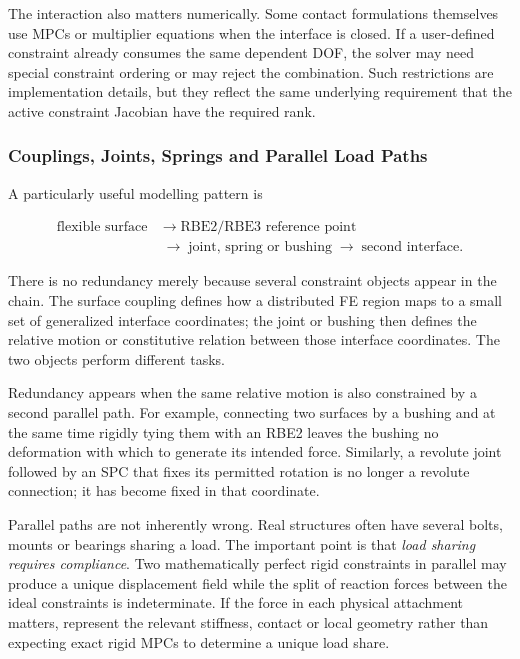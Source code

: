 The interaction also matters numerically. Some contact formulations themselves
use MPCs or multiplier equations when the interface is closed. If a user-defined
constraint already consumes the same dependent DOF, the solver may need special
constraint ordering or may reject the combination. Such restrictions are
implementation details, but they reflect the same underlying requirement that
the active constraint Jacobian have the required rank.

\subsubsection{Couplings, Joints, Springs and Parallel Load Paths}

A particularly useful modelling pattern is

\begin{equation}
\begin{aligned}
    \text{flexible surface}
    &\;\longrightarrow\;
    \text{RBE2/RBE3 reference point}\\
    &\;\longrightarrow\;
    \text{joint, spring or bushing}
    \;\longrightarrow\;
    \text{second interface}.
\end{aligned}
\end{equation}

There is no redundancy merely because several constraint objects appear in the
chain. The surface coupling defines how a distributed FE region maps to a small
set of generalized interface coordinates; the joint or bushing then defines the
relative motion or constitutive relation between those interface coordinates.
The two objects perform different tasks.

Redundancy appears when the same relative motion is also constrained by a second
parallel path. For example, connecting two surfaces by a bushing and at the same
time rigidly tying them with an RBE2 leaves the bushing no deformation with which
to generate its intended force. Similarly, a revolute joint followed by an SPC
that fixes its permitted rotation is no longer a revolute connection; it has
become fixed in that coordinate.

Parallel paths are not inherently wrong. Real structures often have several
bolts, mounts or bearings sharing a load. The important point is that \emph{load
sharing requires compliance}. Two mathematically perfect rigid constraints in
parallel may produce a unique displacement field while the split of reaction
forces between the ideal constraints is indeterminate. If the force in each
physical attachment matters, represent the relevant stiffness, contact or local
geometry rather than expecting exact rigid MPCs to determine a unique load
share.

